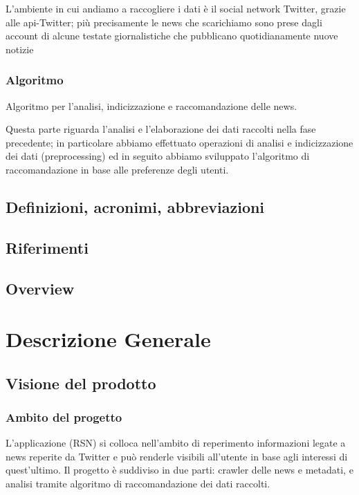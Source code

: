 \documentclass[12pt]{article}
\begin{document}
L’ambiente in cui andiamo a raccogliere i dati è il social network Twitter, grazie alle api-Twitter; più precisamente le news che scarichiamo sono prese dagli account di alcune testate giornalistiche che pubblicano quotidianamente nuove notizie

\subsubsection{Algoritmo}

Algoritmo per l’analisi, indicizzazione e raccomandazione delle news.

Questa parte riguarda l’analisi e l’elaborazione dei dati raccolti nella fase precedente; in particolare abbiamo effettuato operazioni di analisi e indicizzazione dei dati (preprocessing) ed in seguito abbiamo sviluppato l’algoritmo di raccomandazione in base alle preferenze degli utenti.


\subsection{Definizioni, acronimi, abbreviazioni}
\subsection{Riferimenti}
\subsection{Overview}


\newpage
\section{Descrizione Generale}

\subsection{Visione del prodotto}
\subsubsection{Ambito del progetto}

L’applicazione (RSN) si colloca nell’ambito di reperimento informazioni legate a news reperite da Twitter e può renderle visibili all’utente in base agli interessi di quest’ultimo. Il progetto è suddiviso in due parti: crawler delle news e metadati, e analisi tramite algoritmo di raccomandazione dei dati raccolti.
\end{document}
